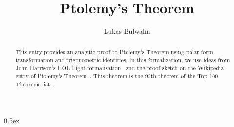 \documentclass[11pt,a4paper]{article}
\begin{document}
\title{Ptolemy's Theorem}
\author{Lukas Bulwahn}
\maketitle

\begin{abstract}

This entry provides an analytic proof to Ptolemy's Theorem using
polar form transformation and trigonometric identities.
In this formalization, we use ideas from John Harrison's HOL Light
formalization~\cite{Harrison} and the proof sketch on the Wikipedia entry of
Ptolemy's Theorem~\cite{wiki:PtolemysTheorem-2016}.
This theorem is the 95th theorem of the Top 100 Theorems list~\cite{Wiedijk}.

\end{abstract}

\tableofcontents

\parindent 0pt\parskip 0.5ex





\end{document}
